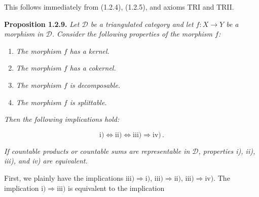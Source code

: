 This follows immediately from (1.2.4), (1.2.5), and axioms TRI and TRII.

\medskip
\noindent\textbf{Proposition 1.2.9.}\quad
\emph{Let $\mathcal D$ be a triangulated category and let
$f\colon X\longrightarrow Y$ be a morphism in $\mathcal D$. Consider the
following properties of the morphism $f$:}

\begin{enumerate}
\renewcommand{\labelenumi}{\roman{enumi})}
\item \emph{The morphism $f$ has a kernel.}
\item \emph{The morphism $f$ has a cokernel.}
\item \emph{The morphism $f$ is decomposable.}
\item \emph{The morphism $f$ is splittable.}
\end{enumerate}

\noindent\emph{Then the following implications hold:}

\[
  \mathrm{i)}\Longleftrightarrow\mathrm{ii)}
  \Longleftrightarrow\mathrm{iii)}\Longrightarrow\mathrm{iv)}\,.
\]

\emph{If countable products or countable sums are representable in
$\mathcal D$, properties \textnormal{i)}, \textnormal{ii)},
\textnormal{iii)}, and \textnormal{iv)} are equivalent.}

First, we plainly have the implications
$\mathrm{iii)}\Longrightarrow\mathrm{i)}$,
$\mathrm{iii)}\Longrightarrow\mathrm{ii)}$,
$\mathrm{iii)}\Longrightarrow\mathrm{iv)}$. The implication
$\mathrm{i)}\Longrightarrow\mathrm{iii)}$ is equivalent to the implication
\endgroup
